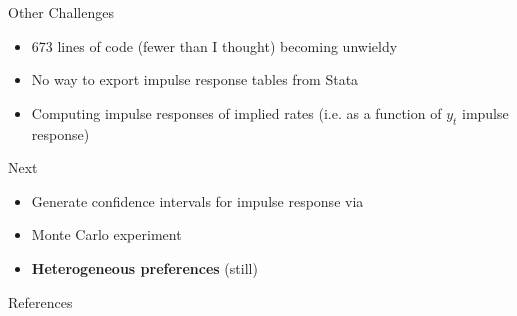 \documentclass{beamer}
\begin{document}
\begin{frame}{Other Challenges}
\begin{itemize}
\item 673 lines of code (fewer than I thought) becoming unwieldy
\item No way to export impulse response tables from Stata
\item Computing impulse responses of implied rates (i.e. as a function of $y_t$ impulse response)
\end{itemize}
\end{frame}

\begin{frame}{Next}
\begin{itemize}
\item Generate confidence intervals for impulse response via \cite{kilian98}
\item Monte Carlo experiment
\item \textbf{Heterogeneous preferences} (still)
\end{itemize}
\end{frame}

\begin{frame}{References}


\end{frame}
\end{document}
